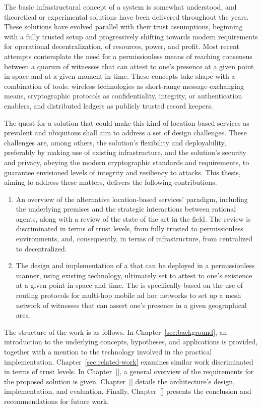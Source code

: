 The basic infrastructural concept of a \pol{} system is somewhat understood, and theoretical or experimental solutions have been delivered throughout the years. These solutions have evolved parallel with their trust assumptions, beginning with a fully trusted setup and progressively shifting towards modern requirements for operational decentralization, of resources, power, and profit. Most recent attempts contemplate the need for a permissionless means of reaching consensus between a quorum of witnesses that can attest to one's presence at a given point in space and at a given moment in time. These concepts take shape with a combination of tools: wireless technologies as short-range message-exchanging means, cryptographic protocols as confidentiality, integrity, or authentication enablers, and distributed ledgers as publicly trusted record keepers. 

The quest for a solution that could make this kind of location-based services as prevalent and ubiquitous shall aim to address a set of design challenges. These challenges are, among others, the solution's flexibility and deployability, preferably by making use of existing infrastructure, and the solution's security and privacy, obeying the modern cryptographic standards and requirements, to guarantee envisioned levels of integrity and resiliency to attacks. This thesis, aiming to address these matters, delivers the following contributions:
\begin{enumerate}
\item An overview of the alternative location-based services' paradigm, including the underlying premises and the strategic interactions between rational agents, along with a review of the state of the art in the field. The review is discriminated in terms of trust levels, from fully trusted to permissionless environments, and, consequently, in terms of infrastructure, from centralized to decentralized.
\item The design and implementation of a \poc{} that can be deployed in a permissionless manner, using existing technology, ultimately set to attest to one's existence at a given point in space and time. The \poc{} is specifically based on the use of routing protocols for multi-hop mobile ad hoc networks to set up a mesh network of witnesses that can assert one's presence in a given geographical area.
\end{enumerate}

The structure of the work is as follows. In Chapter~\ref{sec:background}, an introduction to the underlying concepts, hypotheses, and applications is provided, together with a mention to the technology involved in the practical implementation. Chapter~\ref{sec:related-work} examines similar work discriminated in terms of trust levels. In Chapter~\ref{}, a general overview of the requirements for the proposed solution is given. Chapter~\ref{} details the architecture's design, implementation, and evaluation. Finally, Chapter~\ref{} presents the conclusion and recommendations for future work.
